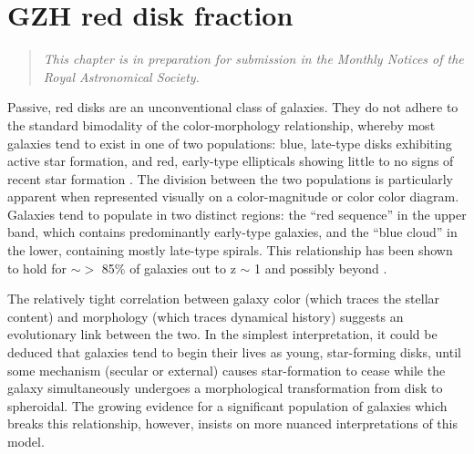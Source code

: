 
\chapter{GZH red disk fraction}
\label{chap:gzh_red_disks}

\begin{quote}
\emph{This chapter is in preparation for submission in the Monthly Notices of the Royal Astronomical Society.}\\
\end{quote}

Passive, red disks are an unconventional class of galaxies. They do not adhere to the standard bimodality of the color-morphology relationship, whereby most galaxies tend to exist in one of two populations: blue, late-type disks exhibiting active star formation, and red, early-type ellipticals showing little to no signs of recent star formation \citep{Strateva2001, Baldry2004, Correa2017}. The division between the two populations is particularly apparent when represented visually on a color-magnitude or color color diagram. Galaxies tend to populate in two distinct regions: the ``red sequence'' in the upper band, which contains predominantly early-type galaxies, and the ``blue cloud'' in the lower, containing mostly late-type spirals. This relationship has been shown to hold for $\sim >$ 85\% of galaxies out to z $\sim$ 1 \citep{Bell2004,Cirasuolo2007,Mignoli2009} and possibly beyond \citep{Giallongo2005, vanDokkum2006, Franzetti2007, Cassata2008}. 

The relatively tight correlation between galaxy color (which traces the stellar content) and morphology (which traces dynamical history) suggests an evolutionary link between the two. In the simplest interpretation, it could be deduced that galaxies tend to begin their lives as young, star-forming disks, until some mechanism (secular or external) causes star-formation to cease while the galaxy simultaneously undergoes a morphological transformation from disk to spheroidal. The growing evidence for a significant population of galaxies which breaks this relationship, however, insists on more nuanced interpretations of this model. 

